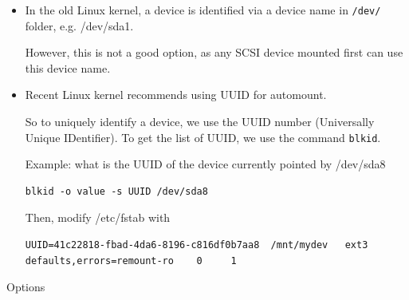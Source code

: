 \begin{itemize}
  \item In the old Linux kernel, a device is identified via a device name in
  \verb!/dev/! folder, e.g. /dev/sda1. 
 
   However, this is not a good option, as any SCSI device mounted first can use
   this device name. 
   

  \item Recent Linux kernel recommends using UUID for automount. 

   So to uniquely identify a device, we use the UUID number (Universally Unique
   IDentifier). To get the list of UUID, we use the command \verb!blkid!.
   
Example: what is the UUID of the device currently pointed by /dev/sda8
\begin{verbatim}
blkid -o value -s UUID /dev/sda8
\end{verbatim}
  
Then, modify /etc/fstab with
{\tiny
\begin{verbatim}
UUID=41c22818-fbad-4da6-8196-c816df0b7aa8  /mnt/mydev   ext3 defaults,errors=remount-ro    0     1
\end{verbatim}
}
\end{itemize}
Options 
